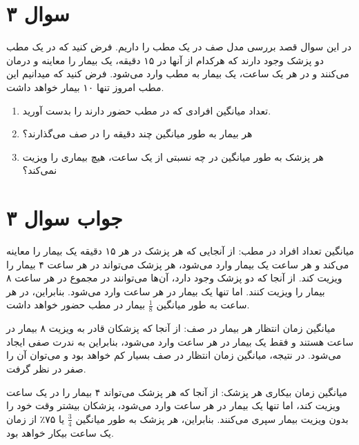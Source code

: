 \section*{سوال ۳}

در این سوال قصد بررسی مدل صف در یک مطب را داریم. فرض کنید که در یک مطب دو پزشک وجود دارند که هرکدام از آنها در ۱۵ دقیقه، یک بیمار را معاینه و درمان می‌کنند و در هر یک ساعت، یک بیمار به مطب وارد می‌شود. فرض کنید که میدانیم این مطب امروز تنها ۱۰ بیمار خواهد داشت.

\begin{enumerate}
	\item تعداد میانگین افرادی که در مطب حضور دارند را بدست آورید.
	\item هر بیمار به طور میانگین چند دقیقه را در صف می‌گذارند؟
	\item هر پزشک به طور میانگین در چه نسبتی از یک ساعت، هیچ بیماری را ویزیت نمی‌کند؟
\end{enumerate}

\section*{جواب سوال ۳}

میانگین تعداد افراد در مطب: از آنجایی که هر پزشک در هر ۱۵ دقیقه یک بیمار را معاینه می‌کند و هر ساعت یک بیمار وارد می‌شود، هر پزشک می‌تواند در هر ساعت ۴ بیمار را ویزیت کند. از آنجا که دو پزشک وجود دارد، آن‌ها می‌توانند در مجموع در هر ساعت ۸ بیمار را ویزیت کنند. اما تنها یک بیمار در هر ساعت وارد می‌شود. بنابراین، در هر ساعت به طور میانگین \(\frac{1}{8}\) بیمار در مطب حضور خواهد داشت.

میانگین زمان انتظار هر بیمار در صف: از آنجا که پزشکان قادر به ویزیت ۸ بیمار در ساعت هستند و فقط یک بیمار در هر ساعت وارد می‌شود، بنابراین به ندرت صفی ایجاد می‌شود. در نتیجه، میانگین زمان انتظار در صف بسیار کم خواهد بود و می‌توان آن را صفر در نظر گرفت.

میانگین زمان بیکاری هر پزشک: از آنجا که هر پزشک می‌تواند ۴ بیمار را در یک ساعت ویزیت کند، اما تنها یک بیمار در هر ساعت وارد می‌شود، پزشکان بیشتر وقت خود را بدون ویزیت بیمار سپری می‌کنند. بنابراین، هر پزشک به طور میانگین \(\frac{3}{4}\) یا ۷۵٪ از زمان یک ساعت بیکار خواهد بود.
